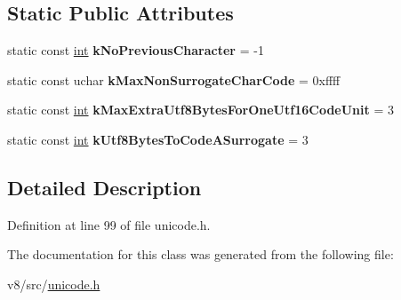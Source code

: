 \subsection*{Static Public Attributes}
\begin{DoxyCompactItemize}
\item 
\mbox{\label{classunibrow_1_1Utf16_a1160051ffd27a644ec813172985b3002}} 
static const \mbox{\hyperlink{classint}{int}} {\bfseries k\+No\+Previous\+Character} = -\/1
\item 
\mbox{\label{classunibrow_1_1Utf16_a621e7db0a6d40f06c69c7041f48a5591}} 
static const uchar {\bfseries k\+Max\+Non\+Surrogate\+Char\+Code} = 0xffff
\item 
\mbox{\label{classunibrow_1_1Utf16_a74bc74e44596d0b574d843e6c3bf7eb8}} 
static const \mbox{\hyperlink{classint}{int}} {\bfseries k\+Max\+Extra\+Utf8\+Bytes\+For\+One\+Utf16\+Code\+Unit} = 3
\item 
\mbox{\label{classunibrow_1_1Utf16_aca30a98f189d6b895c08c396761c9495}} 
static const \mbox{\hyperlink{classint}{int}} {\bfseries k\+Utf8\+Bytes\+To\+Code\+A\+Surrogate} = 3
\end{DoxyCompactItemize}


\subsection{Detailed Description}


Definition at line 99 of file unicode.\+h.



The documentation for this class was generated from the following file\+:\begin{DoxyCompactItemize}
\item 
v8/src/\mbox{\hyperlink{unicode_8h}{unicode.\+h}}\end{DoxyCompactItemize}
